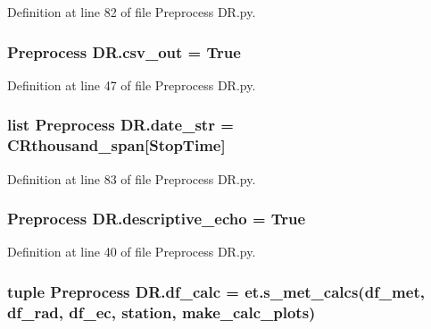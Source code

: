 Definition at line 82 of file Preprocess D\+R.\+py.

\hypertarget{namespace_preprocess_01_d_r_a35685e7b260e2e5876d1b3b56f3e3677}{}
\subsubsection[{csv\+\_\+out}]{\setlength{\rightskip}{0pt plus 5cm}Preprocess D\+R.\+csv\+\_\+out = True}\label{namespace_preprocess_01_d_r_a35685e7b260e2e5876d1b3b56f3e3677}


Definition at line 47 of file Preprocess D\+R.\+py.

\hypertarget{namespace_preprocess_01_d_r_a5dd9db5e04103125b0e1a71ee37e106b}{}
\subsubsection[{date\+\_\+str}]{\setlength{\rightskip}{0pt plus 5cm}list Preprocess D\+R.\+date\+\_\+str = {\bf C\+Rthousand\+\_\+span}\mbox{[}\textquotesingle{}Stop\+Time\textquotesingle{}\mbox{]}}\label{namespace_preprocess_01_d_r_a5dd9db5e04103125b0e1a71ee37e106b}


Definition at line 83 of file Preprocess D\+R.\+py.

\hypertarget{namespace_preprocess_01_d_r_a6349ca51aac5eadefc205154d717c139}{}
\subsubsection[{descriptive\+\_\+echo}]{\setlength{\rightskip}{0pt plus 5cm}Preprocess D\+R.\+descriptive\+\_\+echo = True}\label{namespace_preprocess_01_d_r_a6349ca51aac5eadefc205154d717c139}


Definition at line 40 of file Preprocess D\+R.\+py.

\hypertarget{namespace_preprocess_01_d_r_a07df7a20436d9ce67a065b7180c3053e}{}
\subsubsection[{df\+\_\+calc}]{\setlength{\rightskip}{0pt plus 5cm}tuple Preprocess D\+R.\+df\+\_\+calc = et.\+s\+\_\+met\+\_\+calcs({\bf df\+\_\+met}, {\bf df\+\_\+rad}, {\bf df\+\_\+ec}, {\bf station}, {\bf make\+\_\+calc\+\_\+plots})}\label{namespace_preprocess_01_d_r_a07df7a20436d9ce67a065b7180c3053e}


